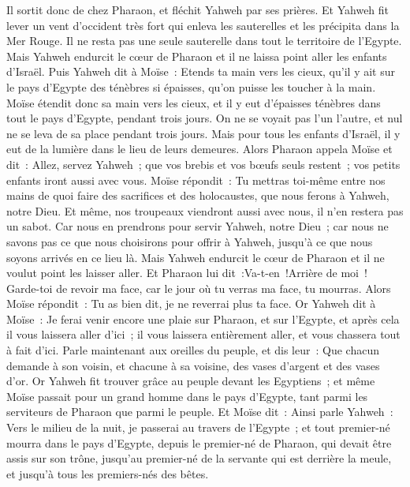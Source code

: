 \begin{multicols}{2}
Il sortit donc de chez Pharaon, et fléchit Yahweh par ses prières.
Et Yahweh fit lever un vent d'occident très fort qui enleva les sauterelles et les précipita dans la Mer Rouge. Il ne resta pas une seule sauterelle dans tout le territoire de l'Egypte.
Mais Yahweh endurcit le cœur de Pharaon et il ne laissa point aller les enfants d'Israël.
Puis Yahweh dit à Moïse~: Etends ta main vers les cieux, qu'il y ait sur le pays d'Egypte des ténèbres si épaisses, qu'on puisse les toucher à la main.
Moïse étendit donc sa main vers les cieux, et il y eut d'épaisses ténèbres dans tout le pays d'Egypte, pendant trois jours.
On ne se voyait pas l'un l'autre, et nul ne se leva de sa place pendant trois jours. Mais pour tous les enfants d'Israël, il y eut de la lumière dans le lieu de leurs demeures.
Alors Pharaon appela Moïse et dit~: Allez, servez Yahweh~; que vos brebis et vos bœufs seuls restent~; vos petits enfants iront aussi avec vous.
Moïse répondit~: Tu mettras toi-même entre nos mains de quoi faire des sacrifices et des holocaustes, que nous ferons à Yahweh, notre Dieu.
Et même, nos troupeaux viendront aussi avec nous, il n'en restera pas un sabot. Car nous en prendrons pour servir Yahweh, notre Dieu~; car nous ne savons pas ce que nous choisirons pour offrir à Yahweh, jusqu'à ce que nous soyons arrivés en ce lieu là.
Mais Yahweh endurcit le cœur de Pharaon et il ne voulut point les laisser aller.
Et Pharaon lui dit~:Va-t-en~!Arrière de moi~! Garde-toi de revoir ma face, car le jour où tu verras ma face, tu mourras.
Alors Moïse répondit~: Tu as bien dit, je ne reverrai plus ta face.
\VerseOne{}Or Yahweh dit à Moïse~: Je ferai venir encore une plaie sur Pharaon, et sur l'Egypte, et après cela il vous laissera aller d'ici~; il vous laissera entièrement aller, et vous chassera tout à fait d'ici.
Parle maintenant aux oreilles du peuple, et dis leur~: Que chacun demande à son voisin, et chacune à sa voisine, des vases d'argent et des vases d'or.
Or Yahweh fit trouver grâce au peuple devant les Egyptiens~; et même Moïse passait pour un grand homme dans le pays d'Egypte, tant parmi les serviteurs de Pharaon que parmi le peuple.
Et Moïse dit~: Ainsi parle Yahweh~: Vers le milieu de la nuit, je passerai au travers de l'Egypte~;
et tout premier-né mourra dans le pays d'Egypte, depuis le premier-né de Pharaon, qui devait être assis sur son trône, jusqu'au premier-né de la servante qui est derrière la meule, et jusqu'à tous les premiers-nés des bêtes.

\end{multicols}
